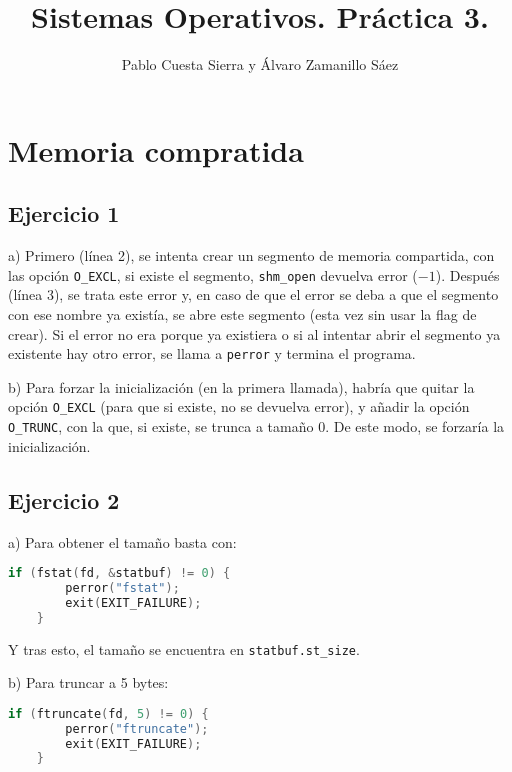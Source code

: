 \documentclass{article}
\begin{document}
\title{Sistemas Operativos. Práctica 3.}
\author{Pablo Cuesta Sierra y Álvaro Zamanillo Sáez}
\date{}
\maketitle

\begin{tcolorbox}
\tableofcontents
\end{tcolorbox}

\section*{Memoria compratida}

\subsection*{Ejercicio 1}

a) Primero (línea 2), se intenta crear un segmento de memoria compartida, con las opción \texttt{O\_EXCL}, si existe el segmento, \texttt{shm\_open} devuelva error ($-1$). Después (línea 3), se trata este error y, en caso de que el error se deba a que el segmento con ese nombre ya existía, se abre este segmento (esta vez sin usar la flag de crear). Si el error no era porque ya existiera o si al intentar abrir el segmento ya existente hay otro error, se llama a \texttt{perror} y termina el programa. 

b) Para forzar la inicialización (en la primera llamada), habría que quitar la opción \texttt{O\_EXCL} (para que si existe, no se devuelva error), y añadir la opción \texttt{O\_TRUNC}, con la que, si existe, se trunca a tamaño 0. De este modo, se forzaría la inicialización. 




\subsection*{Ejercicio 2}

a) Para obtener el tamaño basta con:

\begin{lstlisting}[language=C]
    if (fstat(fd, &statbuf) != 0) {
        perror("fstat");
        exit(EXIT_FAILURE);
    } 
\end{lstlisting} 
Y tras esto, el tamaño se encuentra en \texttt{statbuf.st\_size}.

b) Para truncar a 5 bytes:
\begin{lstlisting}[language=C]
    if (ftruncate(fd, 5) != 0) {
        perror("ftruncate");
        exit(EXIT_FAILURE);
    }
\end{lstlisting}
 
\end{document}
